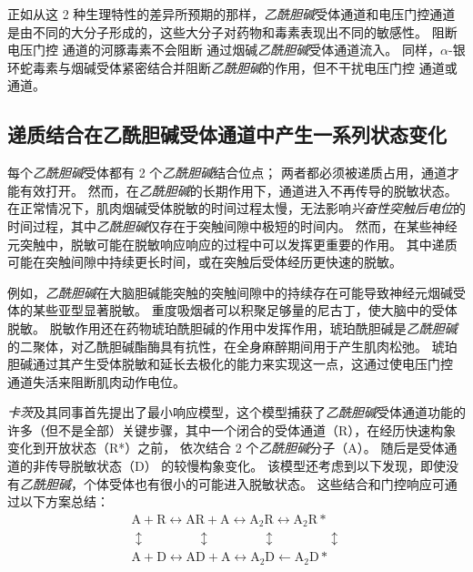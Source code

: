 正如从这 2 种生理特性的差异所预期的那样，\textit{乙酰胆碱}受体通道和电压门控通道是由不同的大分子形成的，这些大分子对药物和毒素表现出不同的敏感性。
阻断电压门控  通道的河豚毒素不会阻断  通过烟碱\textit{乙酰胆碱}受体通道流入。
同样，$\alpha$-银环蛇毒素与烟碱受体紧密结合并阻断\textit{乙酰胆碱}的作用，但不干扰电压门控  通道或  通道。



\subsection{递质结合在乙酰胆碱受体通道中产生一系列状态变化}

每个\textit{乙酰胆碱}受体都有 2 个\textit{乙酰胆碱}结合位点；
两者都必须被递质占用，通道才能有效打开。
然而，在\textit{乙酰胆碱}的长期作用下，通道进入不再传导的脱敏状态。
在正常情况下，肌肉烟碱受体脱敏的时间过程太慢，无法影响\textit{兴奋性突触后电位}的时间过程，其中\textit{乙酰胆碱}仅存在于突触间隙中极短的时间内。
然而，在某些神经元突触中，脱敏可能在脱敏响应响应的过程中可以发挥更重要的作用。
其中递质可能在突触间隙中持续更长时间，或在突触后受体经历更快速的脱敏。


例如，\textit{乙酰胆碱}在大脑胆碱能突触的突触间隙中的持续存在可能导致神经元烟碱受体的某些亚型显著脱敏。
重度吸烟者可以积聚足够量的尼古丁，使大脑中的受体脱敏。
脱敏作用还在药物琥珀酰胆碱的作用中发挥作用，琥珀酰胆碱是\textit{乙酰胆碱}的二聚体，对乙酰胆碱酯酶具有抗性，在全身麻醉期间用于产生肌肉松弛。
琥珀胆碱通过其产生受体脱敏和延长去极化的能力来实现这一点，这通过使电压门控  通道失活来阻断肌肉动作电位。


\textit{卡茨}及其同事首先提出了最小响应模型，这个模型捕获了\textit{乙酰胆碱}受体通道功能的许多（但不是全部）关键步骤，其中一个闭合的受体通道（R），在经历快速构象变化到开放状态（R*）之前， 依次结合 2 个\textit{乙酰胆碱}分子（A）。
随后是受体通道的非传导脱敏状态（D） 的较慢构象变化。
该模型还考虑到以下发现，即使没有\textit{乙酰胆碱}，个体受体也有很小的可能进入脱敏状态。
这些结合和门控响应可通过以下方案总结：
\begin{align*} \label{binding_gating_reactions}
	\text{A}+\text{R} \leftrightarrow \text{AR} + \text{A} \leftrightarrow \text{A}_2 \text{R} \leftrightarrow \text{A}_2 \text{R} *  \\
	\updownarrow \qquad \qquad \updownarrow \qquad \qquad \updownarrow \qquad \qquad \updownarrow  \\ 
	\text{A}+\text{D} \leftrightarrow \text{AD} + \text{A} \leftrightarrow \text{A}_2 \text{D} \leftarrow \text{A}_2 \text{D} * \nonumber
\end{align*}


